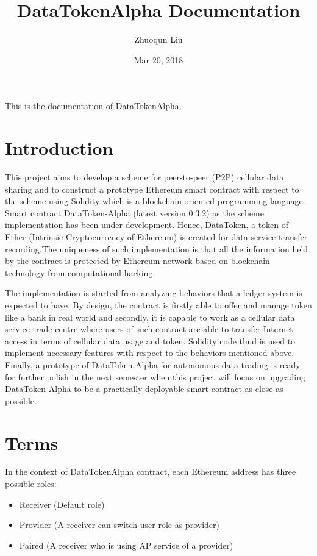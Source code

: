 \documentclass[letterpaper,10pt,english]{sphinxmanual}
\title{DataTokenAlpha Documentation}
\date{Mar 20, 2018}
\author{Zhuoqun Liu}
\begin{document}
\maketitle
\sphinxtableofcontents
{}\label{\detokenize{index::doc}}


This is the documentation of DataTokenAlpha.



\chapter{Introduction}
\label{\detokenize{index:introduction}}\label{\detokenize{index:welcome-to-datatokenalpha}}
This project aims to develop a scheme for peer-to-peer (P2P) cellular data sharing and to
construct a prototype Ethereum smart contract with respect to the scheme using Solidity which is
a blockchain oriented programming language. Smart contract DataToken-Alpha (latest version 0.3.2)
as the scheme implementation has been under development. Hence, DataToken, a token of Ether
(Intrinsic Cryptocurrency of Ethereum) is created for data service transfer recording.The uniqueness
of such implementation is that all the information held by the contract is protected by Ethereum
network based on blockchain technology from computational hacking.

The implementation is started from analyzing behaviors that a ledger system is expected to have.
By design, the contract is firstly able to offer and manage token like a bank in real world
and secondly, it is capable to work as a cellular data service trade centre where users of such
contract are able to transfer Internet access in terms of cellular data usage and token.
Solidity code thud is used to implement necessary features with respect to the behaviors mentioned above.
Finally, a prototype of DataToken-Alpha for autonomous data trading is ready for further polish
in the next semester when this project will focus on upgrading DataToken-Alpha to be a practically
deployable smart contract as close as possible.


\chapter{Terms}
\label{\detokenize{index:terms}}
In the context of DataTokenAlpha contract, each Ethereum address
has three possible roles:
\begin{itemize}
\item {} 
Receiver (Default role)

\item {} 
Provider (A receiver can switch user role as provider)

\item {} 
Paired (A receiver who is using AP service of a provider)

\end{itemize}
\end{document}
